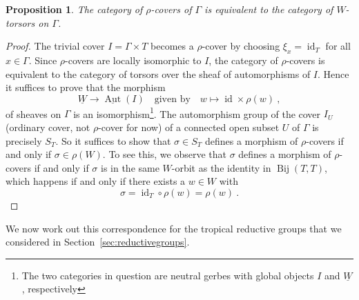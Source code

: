 \documentclass[10pt, a4paper]{amsart}
\newtheorem{proposition}[theorem]{Proposition}
\theoremstyle{definition}
\theoremstyle{myitemstyle}
\DeclareMathOperator{\Aut}{Aut}
\DeclareMathOperator{\id}{id}
\DeclareMathOperator{\Bij}{Bij}
\begin{document}
\begin{proposition}
    \label{prop:category of rho-covers}
    The category of $\rho$-covers of $\Gamma$ is equivalent to the category of $W$-torsors on $\Gamma$.
\end{proposition}

\begin{proof}
    The trivial cover $I=\Gamma\times T$ becomes a $\rho$-cover by choosing $\xi_x=\id_{T}$ for all $x\in \Gamma$. Since $\rho$-covers are locally isomorphic to $I$, the category of $\rho$-covers is equivalent to the category of torsors over the sheaf of automorphisms of $I$. Hence it suffices to prove that the morphism 
    \[
    \underline W\longrightarrow \underline{\Aut}(I)\quad \text{given by} \quad w\longmapsto \id\times \rho(w) \ , 
    \]
    of sheaves on $\Gamma$ is an isomorphism\footnote{The two categories in question are neutral gerbes with global objects $I$ and $\underline W$, respectively}. The automorphism group of the cover $I_U$ (ordinary cover, not $\rho$-cover for now) of a connected open subset $U$ of $\Gamma$ is precisely $S_T$. So it suffices to show that $\sigma\in S_T$ defines a morphism of $\rho$-covers if and only if $\sigma\in \rho(W)$. To see this, we observe that $\sigma$ defines a morphism of $\rho$-covers if and only if $\sigma$ is in the same $W$-orbit as the identity in $\Bij(T,T)$, which happens if and only if there exists a $w\in W$ with
    \[
    \sigma=\id_{T}\circ \rho(w)=\rho(w) \ .
    \]
\end{proof}

We now work out this correspondence for the tropical reductive groups that we considered in Section~\ref{sec:reductivegroups}.
\end{document}
